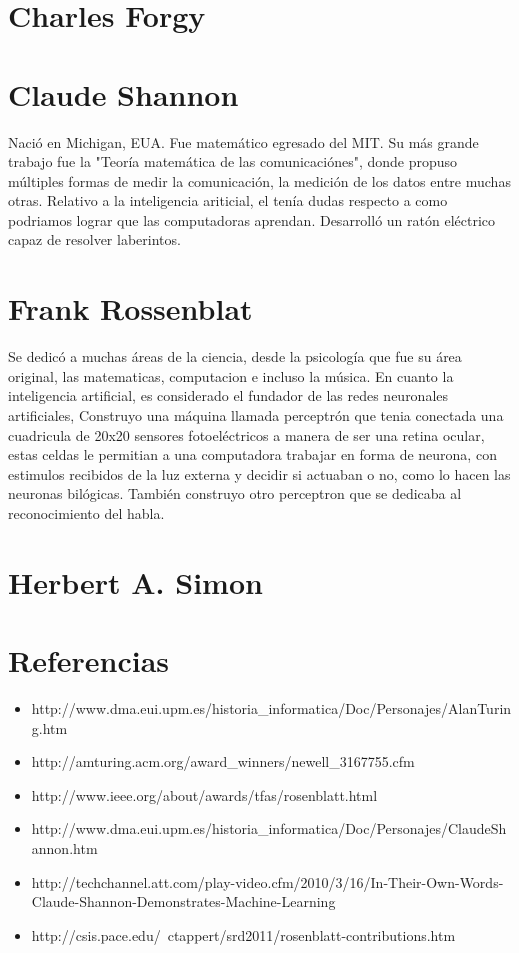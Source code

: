\section{Charles Forgy}

\section{Claude Shannon}

	Nació en Michigan, EUA. Fue matemático egresado del MIT. Su más grande trabajo fue la "Teoría matemática de las comunicaciónes", donde propuso múltiples formas de medir la comunicación, la medición de los datos entre muchas otras. Relativo a la inteligencia ariticial, el tenía dudas respecto a como podriamos lograr que las computadoras aprendan. Desarrolló un ratón eléctrico capaz de resolver laberintos.

\section{Frank Rossenblat}
	Se dedicó a muchas áreas de la ciencia, desde la psicología que fue su área original, las matematicas, computacion e incluso la música. En cuanto la inteligencia artificial, es considerado el fundador de las redes neuronales artificiales, Construyo una máquina llamada perceptrón que tenia conectada una cuadricula de 20x20 sensores fotoeléctricos a manera de ser una retina ocular, estas celdas le permitian a una computadora trabajar en forma de neurona, con estimulos recibidos de la luz externa y decidir si actuaban o no, como lo hacen las neuronas bilógicas. También construyo otro perceptron que se dedicaba al reconocimiento del habla.

\section{Herbert A. Simon}

\section{Referencias}
\begin{itemize}
	\item http://www.dma.eui.upm.es/historia\_informatica/Doc/Personajes/AlanTuring.htm 
	\item http://amturing.acm.org/award\_winners/newell\_3167755.cfm
	\item http://www.ieee.org/about/awards/tfas/rosenblatt.html
	\item http://www.dma.eui.upm.es/historia\_informatica/Doc/Personajes/ClaudeShannon.htm
	\item http://techchannel.att.com/play-video.cfm/2010/3/16/In-Their-Own-Words-Claude-Shannon-Demonstrates-Machine-Learning
	\item http://csis.pace.edu/~ctappert/srd2011/rosenblatt-contributions.htm
\end{itemize}